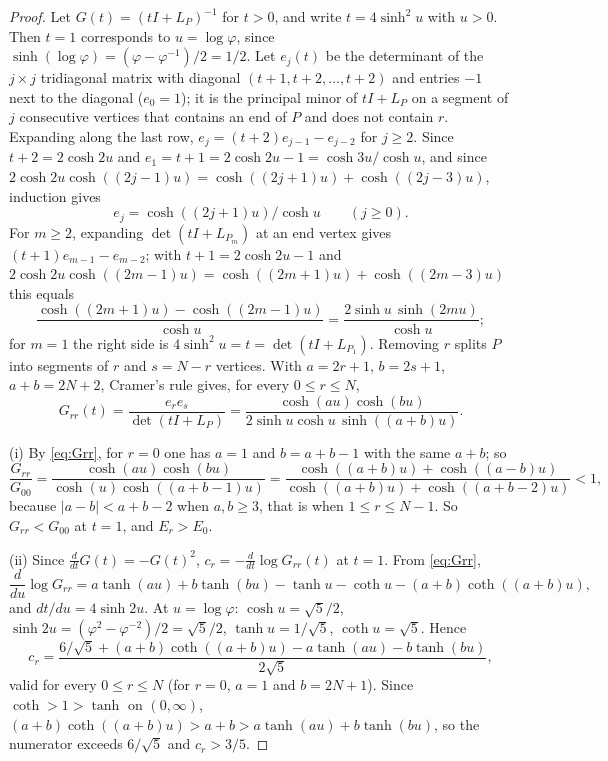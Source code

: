\documentclass[11pt]{amsart}
\theoremstyle{definition}
\theoremstyle{remark}
\begin{document}
\begin{proof}
Let $G(t)=(tI+L_P)^{-1}$ for $t>0$, and write $t=4\sinh^2u$ with $u>0$. Then
$t=1$ corresponds to $u=\log\varphi$, since
$\sinh(\log\varphi)=(\varphi-\varphi^{-1})/2=1/2$. Let $e_j(t)$ be the
determinant of the $j\times j$ tridiagonal matrix with diagonal
$(t+1,t+2,\dots,t+2)$ and entries $-1$ next to the diagonal ($e_0=1$); it is
the principal minor of $tI+L_P$ on a segment of $j$ consecutive vertices
that contains an end of $P$ and does not contain $r$. Expanding along the
last row, $e_j=(t+2)e_{j-1}-e_{j-2}$ for $j\ge2$. Since $t+2=2\cosh2u$ and
$e_1=t+1=2\cosh2u-1=\cosh3u/\cosh u$, and since
$2\cosh2u\cosh((2j-1)u)=\cosh((2j+1)u)+\cosh((2j-3)u)$, induction gives
\[
e_j=\cosh((2j+1)u)/\cosh u\qquad(j\ge0).
\]
For $m\ge2$, expanding $\det(tI+L_{P_m})$ at an end vertex gives
$(t+1)e_{m-1}-e_{m-2}$; with $t+1=2\cosh2u-1$ and
$2\cosh2u\cosh((2m-1)u)=\cosh((2m+1)u)+\cosh((2m-3)u)$ this equals
\[
\frac{\cosh((2m+1)u)-\cosh((2m-1)u)}{\cosh u}=\frac{2\sinh u\,\sinh(2mu)}{\cosh u};
\]
for $m=1$ the right side is $4\sinh^2u=t=\det(tI+L_{P_1})$. Removing $r$
splits $P$ into segments of $r$ and $s=N-r$ vertices. With $a=2r+1$,
$b=2s+1$, $a+b=2N+2$, Cramer's rule gives, for every $0\le r\le N$,
\begin{equation}\label{eq:Grr}
G_{rr}(t)=\frac{e_re_s}{\det(tI+L_P)}=\frac{\cosh(au)\cosh(bu)}{2\sinh u\cosh u\,\sinh((a+b)u)}.
\end{equation}

(i) By \eqref{eq:Grr}, for $r=0$ one has $a=1$ and $b=a+b-1$ with the same
$a+b$; so
\[
\frac{G_{rr}}{G_{00}}=\frac{\cosh(au)\cosh(bu)}{\cosh(u)\cosh((a+b-1)u)}
=\frac{\cosh((a+b)u)+\cosh((a-b)u)}{\cosh((a+b)u)+\cosh((a+b-2)u)}<1,
\]
because $|a-b|<a+b-2$ when $a,b\ge3$, that is when $1\le r\le N-1$. So
$G_{rr}<G_{00}$ at $t=1$, and $E_r>E_0$.

(ii) Since $\frac{d}{dt}G(t)=-G(t)^2$, $c_r=-\frac{d}{dt}\log G_{rr}(t)$ at
$t=1$. From \eqref{eq:Grr},
\[
\frac{d}{du}\log G_{rr}=a\tanh(au)+b\tanh(bu)-\tanh u-\coth u-(a+b)\coth((a+b)u),
\]
and $dt/du=4\sinh2u$. At $u=\log\varphi$: $\cosh u=\sqrt5/2$,
$\sinh2u=(\varphi^2-\varphi^{-2})/2=\sqrt5/2$, $\tanh u=1/\sqrt5$,
$\coth u=\sqrt5$. Hence
\begin{equation}\label{eq:cr}
c_r=\frac{6/\sqrt5+(a+b)\coth((a+b)u)-a\tanh(au)-b\tanh(bu)}{2\sqrt5},
\end{equation}
valid for every $0\le r\le N$ (for $r=0$, $a=1$ and $b=2N+1$). Since
$\coth>1>\tanh$ on $(0,\infty)$, $(a+b)\coth((a+b)u)>a+b>a\tanh(au)+b\tanh(bu)$,
so the numerator exceeds $6/\sqrt5$ and $c_r>3/5$.


\end{proof}
\end{document}
